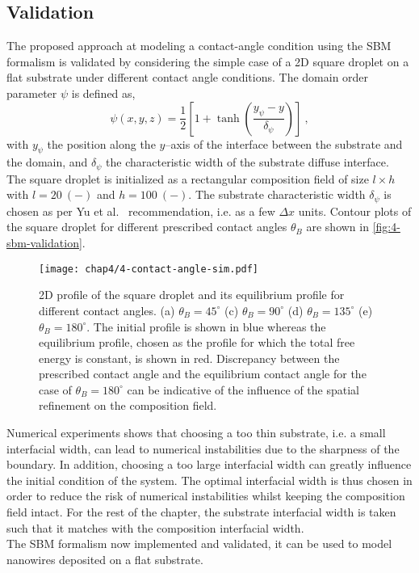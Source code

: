 \subsection{Validation}\label{sec:4-validation}
    The proposed approach at modeling a contact-angle condition using the SBM formalism is validated by considering the simple case of a 2D square droplet on a flat substrate under different contact angle conditions. The domain order parameter $\psi$ is defined as,
    \begin{equation}
        \psi(x,y,z) = \frac{1}{2} \left[1 + \tanh{\left(\frac{y_\psi-y}{\delta_\psi}\right)}  \right]\ ,
    \end{equation}
    with $y_\psi$ the position along the $y$--axis of the interface between the substrate and the domain, and $\delta_\psi$ the characteristic width of the substrate diffuse interface.\\
    The square droplet is initialized as a rectangular composition field of size $l\times h$ with $l=20\ (-)$ and $h=100\ (-)$. The substrate characteristic width $\delta_\psi$ is chosen as per Yu et al.~\cite{YuChenThornton2012} recommendation, i.e. as a few $\Delta x$ units. 
    Contour plots of the square droplet for different prescribed contact angles $\theta_B$ are shown in \autoref{fig:4-sbm-validation}.
    \begin{figure}[H]
        \centering
        \texttt{[image: chap4/4-contact-angle-sim.pdf]}
        \caption{2D profile of the square droplet and its equilibrium profile for different contact angles. (a) $\theta_B = 45^\circ$ (c) $\theta_B = 90^\circ$ (d) $\theta_B = 135^\circ$ (e) $\theta_B = 180^\circ$. The initial profile is shown in blue whereas the equilibrium profile, chosen as the profile for which the total free energy is constant, is shown in red. Discrepancy between the prescribed contact angle and the equilibrium contact angle for the case of $\theta_B=180^\circ$ can be indicative of the influence of the spatial refinement on the composition field.}
        \label{fig:4-sbm-validation}
    \end{figure}
    Numerical experiments shows that choosing a too thin substrate, i.e. a small interfacial width, can lead to numerical instabilities due to the sharpness of the boundary. In addition, choosing a too large interfacial width can greatly influence the initial condition of the system. The optimal interfacial width is thus chosen in order to reduce the risk of numerical instabilities whilst keeping the composition field intact. For the rest of the chapter, the substrate interfacial width is taken such that it matches with the composition interfacial width.\\
    The SBM formalism now implemented and validated, it can be used to model nanowires deposited on a flat substrate.